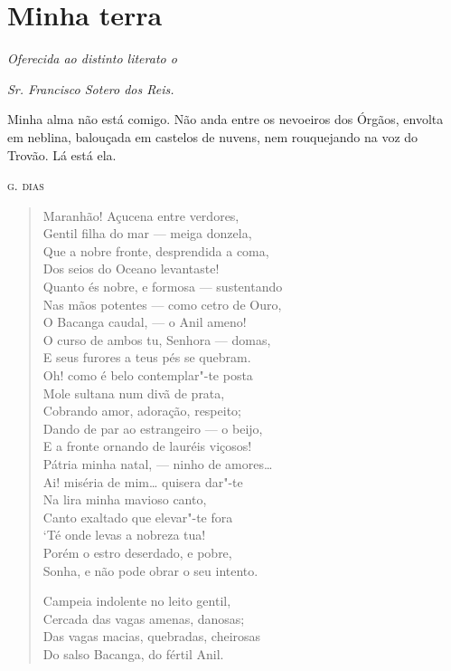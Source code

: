 \chapter{Minha terra}

\hfill{}\emph{Oferecida ao distinto literato o}

\hfill{}\emph{Sr. Francisco Sotero dos Reis.}

\epigraph{Minha alma não está comigo. Não anda entre os nevoeiros dos Órgãos,
envolta em neblina, balouçada em castelos de nuvens, nem rouquejando na
voz do Trovão. Lá está ela.}{\textsc{g. dias}}

\medskip

\begin{verse}
Maranhão! Açucena entre verdores,\\
Gentil filha do mar --- meiga donzela,\\
Que a nobre fronte, desprendida a coma,\\
Dos seios do Oceano levantaste!\\
Quanto és nobre, e formosa --- sustentando\\
Nas mãos potentes --- como cetro de Ouro,\\
O Bacanga caudal, --- o Anil ameno!\\
O curso de ambos tu, Senhora --- domas,\\
E seus furores a teus pés se quebram.\\
Oh! como é belo contemplar"-te posta\\
Mole sultana num divã de prata,\\
Cobrando amor, adoração, respeito;\\
Dando de par ao estrangeiro --- o beijo,\\
E a fronte ornando de lauréis viçosos!\\
Pátria minha natal, --- ninho de amores\ldots{}\\
Ai! miséria de mim\ldots{} quisera dar"-te\\
Na lira minha mavioso canto,\\
Canto exaltado que elevar"-te fora\\
`Té onde levas a nobreza tua!\\
Porém o estro deserdado, e pobre,\\
Sonha, e não pode obrar o seu intento.

Campeia indolente no leito gentil,\\
Cercada das vagas amenas, danosas;\\
Das vagas macias, quebradas, cheirosas\\
Do salso Bacanga, do fértil Anil.


\end{verse}
